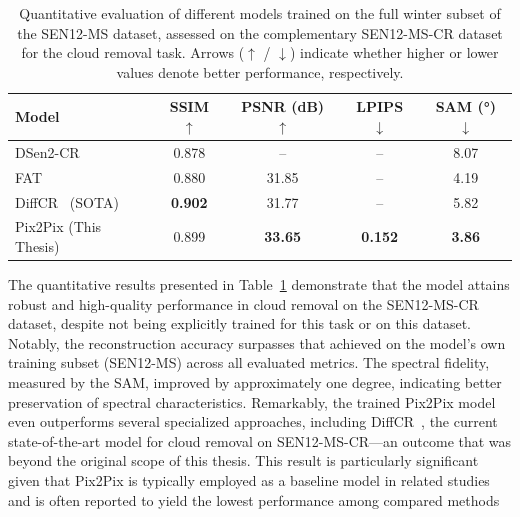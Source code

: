 \begin{table}[!htbp]
    \centering
    \caption[Quantitative results on cloud removal]{Quantitative evaluation of different models trained on the full winter subset of the SEN12-MS dataset, assessed on the complementary SEN12-MS-CR dataset for the cloud removal task. Arrows ($\uparrow$ / $\downarrow$) indicate whether higher or lower values denote better performance, respectively.}
    \begin{tabular}{lcccc}
        \toprule
        \textbf{Model}               & \textbf{SSIM $\uparrow$} & \textbf{PSNR (dB) $\uparrow$} & \textbf{LPIPS $\downarrow$} & \textbf{SAM (°) $\downarrow$} \\
        \midrule
        DSen2-CR~\cite{CR_SEN2_dRNN} & 0.878                    & --                            & --                          & 8.07                          \\
        FAT~\cite{c_guided_fus_s2ot} & 0.880                    & 31.85                         & --                          & 4.19                          \\
        DiffCR~\cite{DiffCR} (SOTA)  & \textbf{0.902}           & 31.77                         & --                          & 5.82                          \\
        Pix2Pix (This Thesis)        & 0.899                    & \textbf{33.65}                & \textbf{0.152}              & \textbf{3.86}                 \\
        \bottomrule
    \end{tabular}
    \label{tab:quantitative_result_cr}
\end{table}

The quantitative results presented in Table~\ref{tab:quantitative_result_cr} demonstrate that the model attains robust and high-quality performance in cloud removal on the SEN12-MS-CR dataset, despite not being explicitly trained for this task or on this dataset. Notably, the reconstruction accuracy surpasses that achieved on the model’s own training subset (SEN12-MS) across all evaluated metrics. The spectral fidelity, measured by the SAM, improved by approximately one degree, indicating better preservation of spectral characteristics. Remarkably, the trained Pix2Pix model even outperforms several specialized approaches, including DiffCR~\cite{DiffCR}, the current state-of-the-art model for cloud removal on SEN12-MS-CR—an outcome that was beyond the original scope of this thesis. This result is particularly significant given that Pix2Pix is typically employed as a baseline model in related studies and is often reported to yield the lowest performance among compared methods 

